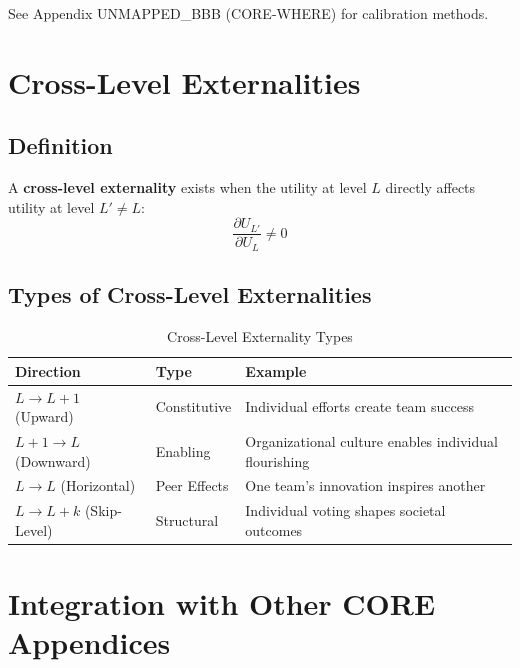 See Appendix UNMAPPED_BBB (CORE-WHERE) for calibration methods.


\section{Cross-Level Externalities}
\label{sec:who-externalities}

\subsection{Definition}

\begin{definition}
A \textbf{cross-level externality} exists when the utility at level $L$ directly affects
utility at level $L' \neq L$:
\begin{equation}
\frac{\partial U_{L'}}{\partial U_L} \neq 0
\end{equation}
\end{definition}

\subsection{Types of Cross-Level Externalities}

\begin{table}[htbp]
\centering
\caption{Cross-Level Externality Types}
\label{tab:who-externalities}
\renewcommand{\arraystretch}{1.3}
\begin{tabular}{@{}lll@{}}
\toprule
\textbf{Direction} & \textbf{Type} & \textbf{Example} \\
\midrule
$L \to L+1$ (Upward) & Constitutive & Individual efforts create team success \\
$L+1 \to L$ (Downward) & Enabling & Organizational culture enables individual flourishing \\
$L \to L$ (Horizontal) & Peer Effects & One team's innovation inspires another \\
$L \to L+k$ (Skip-Level) & Structural & Individual voting shapes societal outcomes \\
\bottomrule
\end{tabular}
\end{table}


\section{Integration with Other CORE Appendices}
\label{sec:who-integration}

